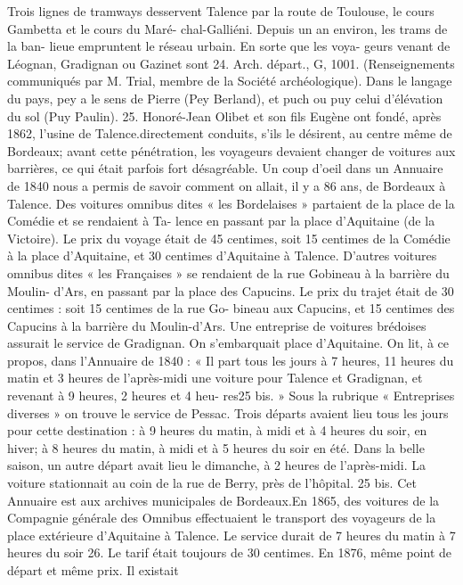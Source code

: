 \documentclass[a4paper,11pt]{book}
\begin{document}
Trois lignes de tramways desservent Talence par la
route de Toulouse, le cours Gambetta et le cours du Maré-
chal-Galliéni. Depuis un an environ, les trams de la ban-
lieue empruntent le réseau urbain. En sorte que les voya-
geurs venant de Léognan, Gradignan ou Gazinet sont
24. Arch. départ., G, 1001. (Renseignements communiqués par M. Trial,
membre de la Société archéologique).
Dans le langage du pays, pey a le sens de Pierre (Pey Berland), et
puch ou puy celui d'élévation du sol (Puy Paulin).
25. Honoré-Jean Olibet et son fils Eugène ont fondé, après 1862,
l'usine de Talence.directement conduits, s'ils le désirent, au centre même de
Bordeaux; avant cette pénétration, les voyageurs devaient
changer de voitures aux barrières, ce qui était parfois fort
désagréable.
Un coup d'oeil dans un Annuaire de 1840 nous a permis
de savoir comment on allait, il y a 86 ans, de Bordeaux
à Talence. Des voitures omnibus dites « les Bordelaises »
partaient de la place de la Comédie et se rendaient à Ta-
lence en passant par la place d'Aquitaine (de la Victoire).
Le prix du voyage était de 45 centimes, soit 15 centimes
de la Comédie à la place d'Aquitaine, et 30 centimes
d'Aquitaine à Talence.
D'autres voitures omnibus dites « les Françaises » se
rendaient de la rue Gobineau à la barrière du Moulin-
d'Ars, en passant par la place des Capucins. Le prix du
trajet était de 30 centimes : soit 15 centimes de la rue Go-
bineau aux Capucins, et 15 centimes des Capucins à la
barrière du Moulin-d'Ars.
Une entreprise de voitures brédoises assurait le service
de Gradignan. On s'embarquait place d'Aquitaine. On lit,
à ce propos, dans l'Annuaire de 1840 :
« Il part tous les jours à 7 heures, 11 heures du matin
et 3 heures de l'après-midi une voiture pour Talence et
Gradignan, et revenant à 9 heures, 2 heures et 4 heu-
res25 bis. »
Sous la rubrique « Entreprises diverses » on trouve le
service de Pessac. Trois départs avaient lieu tous les jours
pour cette destination : à 9 heures du matin, à midi et à
4 heures du soir, en hiver; à 8 heures du matin, à midi
et à 5 heures du soir en été. Dans la belle saison, un autre
départ avait lieu le dimanche, à 2 heures de l'après-midi.
La voiture stationnait au coin de la rue de Berry, près
de l'hôpital.
25 bis. Cet Annuaire est aux archives municipales de Bordeaux.En 1865, des voitures de la Compagnie générale des
Omnibus effectuaient le transport des voyageurs de la
place extérieure d'Aquitaine à Talence. Le service durait
de 7 heures du matin à 7 heures du soir 26. Le tarif était
toujours de 30 centimes.
En 1876, même point de départ et même prix. Il existait
\end{document}
